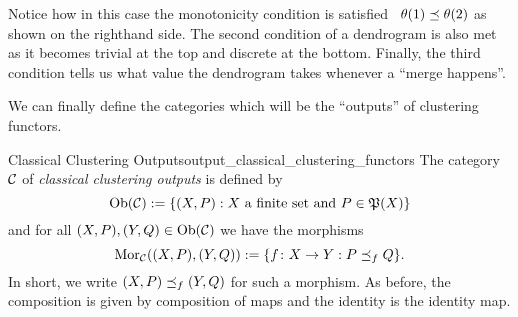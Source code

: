 \begin{example}{}{}
\begin{center}
\begin{minipage}{\linewidth}
\label{fig:dendrogram_example}
\end{minipage}
\end{center}

Notice how in this case the monotonicity condition is satisfied \eg\ $\theta(1) \preceq \theta(2)$ as shown on the righthand side. The second condition of a dendrogram is also met as it becomes trivial at the top and discrete at the bottom. Finally, the third condition tells us what value the dendrogram takes whenever a ``merge happens''.
\end{example}

We can finally define the categories which will be the ``outputs'' of clustering functors.

\begin{definition}{Classical Clustering Outputs\cite[Def.~3.2]{Carlsson2010}}{output_classical_clustering_functors}
The category $\mathcal{C}$ of \emph{classical clustering outputs} is defined by
\begin{equation*}
    \mathrm {Ob}(\mathcal{C}) := \{(X, P): X \text{ a finite set and } P \in \mathfrak{P}(X)\}
\end{equation*}
and for all $(X,P), (Y,Q) \in \mathrm {Ob}(\mathcal{C})$ we have the morphisms
\begin{equation*}
    \mathrm {Mor}_{\mathcal{C}}((X,P), (Y,Q)) := \{f\colon X \to Y: P \preceq_f Q\}.
\end{equation*}
In short, we write $(X,P) \preceq_f (Y,Q)$ for such a morphism. As before, the composition is given by composition of maps and the identity is the identity map.
\end{definition}

